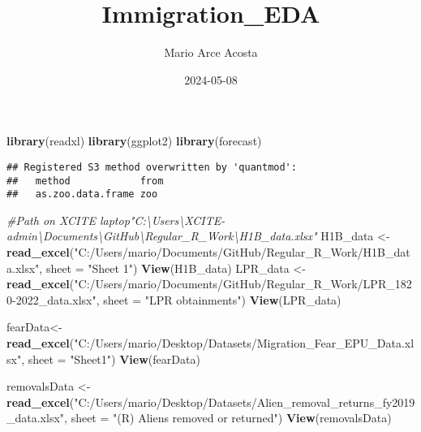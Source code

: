 \documentclass[
]{article}
\title{Immigration\_EDA}
\author{Mario Arce Acosta}
\date{2024-05-08}
\newenvironment{Shaded}{\begin{snugshade}}{\end{snugshade}}
\newcommand{\AttributeTok}[1]{\textcolor[rgb]{0.13,0.29,0.53}{#1}}
\newcommand{\CommentTok}[1]{\textcolor[rgb]{0.56,0.35,0.01}{\textit{#1}}}
\newcommand{\FunctionTok}[1]{\textcolor[rgb]{0.13,0.29,0.53}{\textbf{#1}}}
\newcommand{\NormalTok}[1]{#1}
\newcommand{\OtherTok}[1]{\textcolor[rgb]{0.56,0.35,0.01}{#1}}
\newcommand{\StringTok}[1]{\textcolor[rgb]{0.31,0.60,0.02}{#1}}
\begin{document}
\maketitle

\begin{Shaded}
\begin{Highlighting}[]
\FunctionTok{library}\NormalTok{(readxl)}
\FunctionTok{library}\NormalTok{(ggplot2)}
\FunctionTok{library}\NormalTok{(forecast)}
\end{Highlighting}
\end{Shaded}

\begin{verbatim}
## Registered S3 method overwritten by 'quantmod':
##   method            from
##   as.zoo.data.frame zoo
\end{verbatim}

\begin{Shaded}
\begin{Highlighting}[]
\CommentTok{\#Path on XCITE laptop"C:\textbackslash{}Users\textbackslash{}XCITE{-}admin\textbackslash{}Documents\textbackslash{}GitHub\textbackslash{}Regular\_R\_Work\textbackslash{}H1B\_data.xlsx"}
\NormalTok{H1B\_data }\OtherTok{\textless{}{-}} \FunctionTok{read\_excel}\NormalTok{(}\StringTok{"C:/Users/mario/Documents/GitHub/Regular\_R\_Work/H1B\_data.xlsx"}\NormalTok{, }\AttributeTok{sheet =} \StringTok{"Sheet 1"}\NormalTok{)}
\FunctionTok{View}\NormalTok{(H1B\_data)}
\NormalTok{LPR\_data }\OtherTok{\textless{}{-}} \FunctionTok{read\_excel}\NormalTok{(}\StringTok{"C:/Users/mario/Documents/GitHub/Regular\_R\_Work/LPR\_1820{-}2022\_data.xlsx"}\NormalTok{, }\AttributeTok{sheet =} \StringTok{"LPR obtainments"}\NormalTok{)}
\FunctionTok{View}\NormalTok{(LPR\_data)}

\NormalTok{fearData}\OtherTok{\textless{}{-}} \FunctionTok{read\_excel}\NormalTok{(}\StringTok{"C:/Users/mario/Desktop/Datasets/Migration\_Fear\_EPU\_Data.xlsx"}\NormalTok{, }\AttributeTok{sheet =} \StringTok{"Sheet1"}\NormalTok{)}
\FunctionTok{View}\NormalTok{(fearData)}

\NormalTok{removalsData }\OtherTok{\textless{}{-}} \FunctionTok{read\_excel}\NormalTok{(}\StringTok{"C:/Users/mario/Desktop/Datasets/Alien\_removal\_returns\_fy2019\_data.xlsx"}\NormalTok{, }\AttributeTok{sheet =} \StringTok{"(R) Aliens removed or returned"}\NormalTok{)}
\FunctionTok{View}\NormalTok{(removalsData)}
\end{Highlighting}
\end{Shaded}
\end{document}
